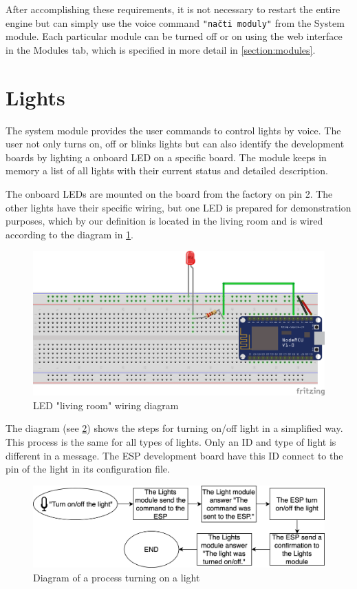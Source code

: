 After accomplishing these requirements, it is not necessary to restart the entire engine but can simply use the voice command \texttt{"načti moduly"} from the System module. Each particular module can be turned off or on using the web interface in the Modules tab, which is specified in more detail in \cref{section:modules}.



\section{Lights}

The system module provides the user commands to control lights by voice. The user not only turns on, off or blinks lights but can also identify the development boards by lighting a onboard LED on a specific board. The module keeps in memory a list of all lights with their current status and detailed description.

The onboard LEDs are mounted on the board from the factory on pin 2. The other lights have their specific wiring, but one LED is prepared for demonstration purposes, which by our definition is located in the living room and is wired according to the diagram in \cref{fig:led_schema}. 

\begin{figure}[H]
	\centering
	\includegraphics[width=\textwidth]{img/led_schema.png}
	\caption{LED "living room" wiring diagram}
	\label{fig:led_schema}
\end{figure}

The diagram (see \cref{fig:turn_light_diagram}) shows the steps for turning on/off light in a simplified way. This process is the same for all types of lights. Only an ID and type of light is different in a message. The ESP development board have this ID connect to the pin of the light in its configuration file.

\begin{figure}[H]
    \centering
    \includegraphics[width=\textwidth]{img/turn_light_diagram.png}
    \caption{Diagram of a process turning on a light}
    \label{fig:turn_light_diagram}
\end{figure}

